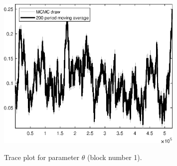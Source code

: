\begin{figure}[H]
\centering
  \includegraphics[width=0.8\textwidth]{BRS_growth_KPR/graphs/TracePlot_theta_blck_1}\\
    \caption{Trace plot for parameter ${\theta}$ (block number 1).}
\end{figure}
